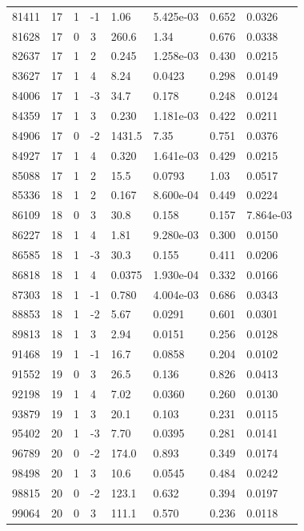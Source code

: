 \documentclass[preview]{standalone}
\begin{document}
{{{{\begin{tabular}{L{1.2cm}C{1.2cm} C{0.3cm}C{0.5cm} C{1.4cm}C{1.4cm} C{1.4cm}C{1.4cm}}
  81411  &    17  & 1     & -1 &  1.06  & 5.425e-03  & 0.652 &  0.0326   \\ 
  81628  &    17  & 0     &  3 &  260.6  & 1.34  & 0.676 &  0.0338   \\ 
  82637  &    17  & 1     &  2 &  0.245  & 1.258e-03  & 0.430 &  0.0215   \\ 
  83627  &    17  & 1     &  4 &  8.24  & 0.0423  & 0.298 &  0.0149   \\ 
  84006  &    17  & 1     & -3 &  34.7  & 0.178  & 0.248 &  0.0124   \\ 
  84359  &    17  & 1     &  3 &  0.230  & 1.181e-03  & 0.422 &  0.0211   \\ 
  84906  &    17  & 0     & -2 &  1431.5  & 7.35  & 0.751 &  0.0376   \\ 
  84927  &    17  & 1     &  4 &  0.320  & 1.641e-03  & 0.429 &  0.0215   \\ 
  85088  &    17  & 1     &  2 &  15.5  & 0.0793  & 1.03 &  0.0517   \\ 
  85336  &    18  & 1     &  2 &  0.167  & 8.600e-04  & 0.449 &  0.0224   \\ 
  86109  &    18  & 0     &  3 &  30.8  & 0.158  & 0.157 &  7.864e-03   \\ 
  86227  &    18  & 1     &  4 &  1.81  & 9.280e-03  & 0.300 &  0.0150   \\ 
  86585  &    18  & 1     & -3 &  30.3  & 0.155  & 0.411 &  0.0206   \\ 
  86818  &    18  & 1     &  4 &  0.0375  & 1.930e-04  & 0.332 &  0.0166   \\ 
  87303  &    18  & 1     & -1 &  0.780  & 4.004e-03  & 0.686 &  0.0343   \\ 
  88853  &    18  & 1     & -2 &  5.67  & 0.0291  & 0.601 &  0.0301   \\ 
  89813  &    18  & 1     &  3 &  2.94  & 0.0151  & 0.256 &  0.0128   \\ 
  91468  &    19  & 1     & -1 &  16.7  & 0.0858  & 0.204 &  0.0102   \\ 
  91552  &    19  & 0     &  3 &  26.5  & 0.136  & 0.826 &  0.0413   \\ 
  92198  &    19  & 1     &  4 &  7.02  & 0.0360  & 0.260 &  0.0130   \\ 
  93879  &    19  & 1     &  3 &  20.1  & 0.103  & 0.231 &  0.0115   \\ 
  95402  &    20  & 1     & -3 &  7.70  & 0.0395  & 0.281 &  0.0141   \\ 
  96789  &    20  & 0     & -2 &  174.0  & 0.893  & 0.349 &  0.0174   \\ 
  98498  &    20  & 1     &  3 &  10.6  & 0.0545  & 0.484 &  0.0242   \\ 
  98815  &    20  & 0     & -2 &  123.1  & 0.632  & 0.394 &  0.0197   \\ 
  99064  &    20  & 0     &  3 &  111.1  & 0.570  & 0.236 &  0.0118   \\ 
\hline 
\end{tabular} 

}}}}
\end{document}
